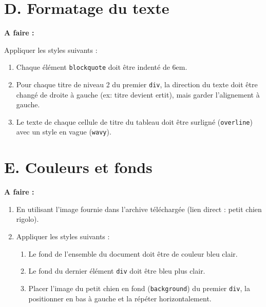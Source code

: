 \documentclass[a4paper,11pt]{article}
\begin{document}
\section{D. Formatage du texte}

\begin{afaire}
\textbf{A faire :}

Appliquer les styles suivants :
\begin{enumerate}
    \item Chaque élément \textcolor{rose}{\texttt{blockquote}} doit être indenté de 6em.
    \item Pour chaque titre de niveau 2 du premier \texttt{div}, la direction du texte doit être changé de droite à gauche (ex: titre devient ertit), mais garder l'alignement à gauche.
    \item Le texte de chaque cellule de titre du tableau doit être surligné (\textcolor{rose}{\texttt{overline}}) avec un style en vague (\textcolor{rose}{\texttt{wavy}}).
\end{enumerate}
\end{afaire}

\section{E. Couleurs et fonds}

\begin{afaire}
\textbf{A faire :}

\begin{enumerate}
    \item En utilisant l'image fournie dans l'archive téléchargée (lien direct : \textcolor{violetuniv}{petit chien rigolo}).
    \item Appliquer les styles suivants :
    \begin{enumerate}
        \item Le fond de l'ensemble du document doit être de couleur bleu clair.
        \item Le fond du dernier élément \textcolor{rose}{\texttt{div}} doit être bleu plus clair.
        \item Placer l'image du petit chien en fond (\textcolor{rose}{\texttt{background}}) du premier \textcolor{rose}{\texttt{div}}, la positionner en bas à gauche et la répéter horizontalement.
    \end{enumerate}
\end{enumerate}
\end{afaire}
\end{document}
